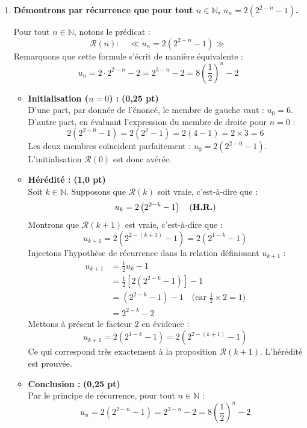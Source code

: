 \documentclass[11pt,a4paper]{article}
\newcommand{\bareme}[1]{\hfill\textbf{\textcolor{secondary}{\sffamily[#1]}}}
\newcommand{\pts}[1]{\textbf{\textcolor{secondary}{\sffamily(#1)}}}
\newcommand{\N}{\mathbb{N}}
\begin{document}
\begin{correctionbox}[Corrigé de l'Exercice 1 \bareme{Total : 4 points}]
\begin{enumerate}[label=\textbf{\arabic*.}]
    \item \textbf{Démontrons par récurrence que pour tout $n \in \N$, $u_n = 2\left(2^{2-n} - 1\right)$.} \bareme{1,5 pt}

    Pour tout $n \in \N$, notons le prédicat :
    \[
    \mathcal{R}(n) : \quad \ll u_n = 2\left(2^{2-n} - 1\right) \gg
    \]
    Remarquons que cette formule s'écrit de manière équivalente :
    \[
    u_n = 2 \cdot 2^{2-n} - 2 = 2^{3-n} - 2 = 8 \left(\frac{1}{2}\right)^n - 2
    \]

    \begin{itemize}[leftmargin=*, label=$\bullet$]
        \item \textbf{Initialisation ($n = 0$) :} \pts{0,25 pt}\\
        D'une part, par donnée de l'énoncé, le membre de gauche vaut : $u_0 = 6$.\\
        D'autre part, en évaluant l'expression du membre de droite pour $n = 0$ :
        \[
        2\left(2^{2-0} - 1\right) = 2\left(2^2 - 1\right) = 2(4 - 1) = 2 \times 3 = 6
        \]
        Les deux membres coïncident parfaitement : $u_0 = 2\left(2^{2-0} - 1\right)$.\\
        L'initialisation $\mathcal{R}(0)$ est donc avérée.

        \item \textbf{Hérédité :} \pts{1,0 pt}\\
        Soit $k \in \N$. Supposons que $\mathcal{R}(k)$ soit vraie, c'est-à-dire que :
        \[
        u_k = 2\left(2^{2-k} - 1\right) \quad \text{(\textbf{H.R.})}
        \]
        Montrons que $\mathcal{R}(k+1)$ est vraie, c'est-à-dire que :
        \[
        u_{k+1} = 2\left(2^{2-(k+1)} - 1\right) = 2\left(2^{1-k} - 1\right)
        \]
        Injectons l'hypothèse de récurrence dans la relation définissant $u_{k+1}$ :
        \begin{align*}
        u_{k+1} &= \frac{1}{2} u_k - 1 \\
                &= \frac{1}{2} \left[ 2\left(2^{2-k} - 1\right) \right] - 1 \\
                &= \left(2^{2-k} - 1\right) - 1 \quad \text{(car $\frac{1}{2} \times 2 = 1$)} \\
                &= 2^{2-k} - 2
        \end{align*}
        Mettons à présent le facteur $2$ en évidence :
        \[
        u_{k+1} = 2\left(2^{1-k} - 1\right) = 2\left(2^{2-(k+1)} - 1\right)
        \]
        Ce qui correspond très exactement à la proposition $\mathcal{R}(k+1)$. L'hérédité est prouvée.

        \item \textbf{Conclusion :} \pts{0,25 pt}\\
        Par le principe de récurrence, pour tout $n \in \N$ :
        \[
        u_n = 2\left(2^{2-n} - 1\right) = 2^{3-n} - 2 = 8 \left(\frac{1}{2}\right)^n - 2
        \]
    \end{itemize}
\end{enumerate}
\end{correctionbox}
\end{document}
